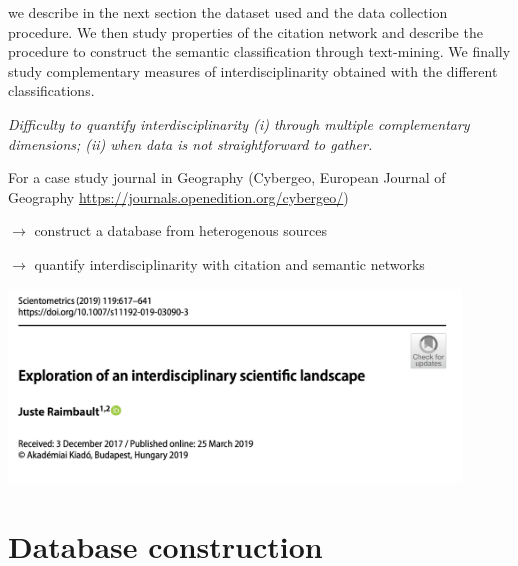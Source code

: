 {we describe in the next section the dataset used and the data collection procedure. We then study properties of the citation network and describe the procedure to construct the semantic classification through text-mining. We finally study complementary measures of interdisciplinarity obtained with the different classifications.

\textit{Difficulty to quantify interdisciplinarity (i) through multiple complementary dimensions; (ii) when data is not straightforward to gather.}

\bigskip

For a case study journal in Geography (Cybergeo, European Journal of Geography \url{https://journals.openedition.org/cybergeo/})

\medskip

$\rightarrow$ construct a database from heterogenous sources

\medskip

$\rightarrow$ quantify interdisciplinarity with citation and semantic networks

\bigskip

\centering

\includegraphics[width=0.9\textwidth]{figures/paper.png}


}

\section{Database construction}

